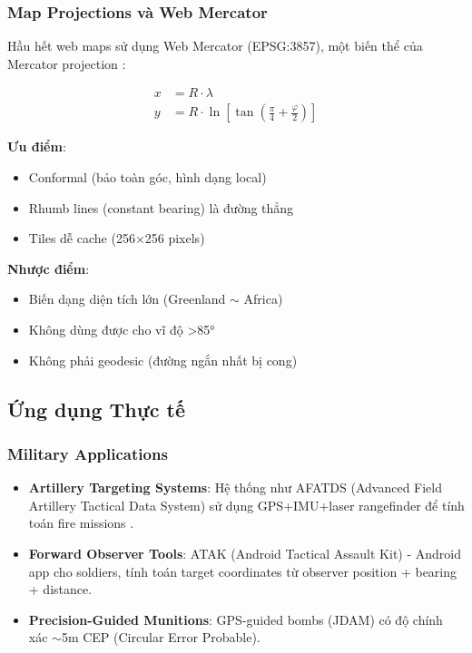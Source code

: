 \subsubsection{Map Projections và Web Mercator}
Hầu hết web maps sử dụng Web Mercator (EPSG:3857), một biến thể của Mercator projection \cite{snyder1987map}:

\begin{equation}
\begin{aligned}
x &= R \cdot \lambda \\
y &= R \cdot \ln\left[\tan\left(\frac{\pi}{4} + \frac{\varphi}{2}\right)\right]
\end{aligned}
\end{equation}

\textbf{Ưu điểm}:
\begin{itemize}
    \item Conformal (bảo toàn góc, hình dạng local)
    \item Rhumb lines (constant bearing) là đường thẳng
    \item Tiles dễ cache (256×256 pixels)
\end{itemize}

\textbf{Nhược điểm}:
\begin{itemize}
    \item Biến dạng diện tích lớn (Greenland $\sim$ Africa)
    \item Không dùng được cho vĩ độ >85°
    \item Không phải geodesic (đường ngắn nhất bị cong)
\end{itemize}

\subsection{Ứng dụng Thực tế}

\subsubsection{Military Applications}
\begin{itemize}
    \item \textbf{Artillery Targeting Systems}: Hệ thống như AFATDS (Advanced Field Artillery Tactical Data System) sử dụng GPS+IMU+laser rangefinder để tính toán fire missions \cite{kaplan2017understanding}.
    
    \item \textbf{Forward Observer Tools}: ATAK (Android Tactical Assault Kit) - Android app cho soldiers, tính toán target coordinates từ observer position + bearing + distance.
    
    \item \textbf{Precision-Guided Munitions}: GPS-guided bombs (JDAM) có độ chính xác $\sim$5m CEP (Circular Error Probable).
\end{itemize}

